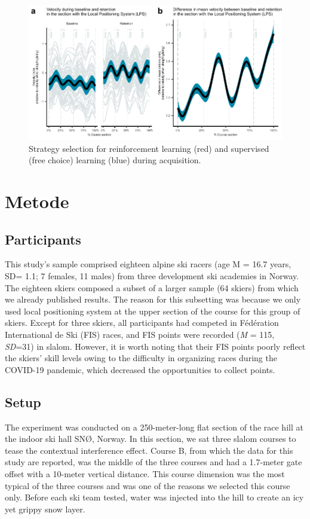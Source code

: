 \documentclass{article}
\begin{document}
\begin{figure}[H]
\centering
\includegraphics{figurer/figure_velocity_2.pdf}
\caption{Strategy selection for reinforcement learning (red) and supervised (free choice) learning (blue) during acquisition.}\label{fig: velocity}
\end{figure}




\section{Metode}


\subsection*{Participants}
This study's sample comprised eighteen alpine ski racers (age M = 16.7 years, SD= 1.1; 7 females, 11 males) from three development ski academies in Norway. The eighteen skiers composed a subset of a larger sample (64 skiers) from which we already published results. The reason for this subsetting was because we only used local positioning system at the upper section of the course for this group of skiers. Except for three skiers, all participants had competed in Fédération International de Ski (FIS) races, and FIS points were recorded (\textit{M} = 115, \textit{SD}=31) in slalom. However, it is worth noting that their FIS points poorly reflect the skiers' skill levels owing to the difficulty in organizing races during the COVID-19 pandemic, which decreased the opportunities to collect points.  

\subsection{Setup}

The experiment was conducted on a 250-meter-long flat section of the race hill at the indoor ski hall SNØ, Norway. In this section, we sat three slalom courses to tease the contextual interference effect. Course B, from which the data for this study are reported, was the middle of the three courses and had a 1.7-meter gate offset with a 10-meter vertical distance. This course dimension was the most typical of the three courses and was one of the reasons we selected this course only. Before each ski team tested, water was injected into the hill to create an icy yet grippy snow layer.
\end{document}
